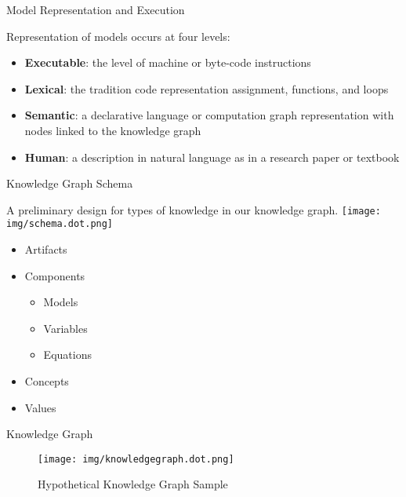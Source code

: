 \documentclass[ignorenonframetext,]{beamer}
\providecommand{\tightlist}{%
  \setlength{\itemsep}{0pt}\setlength{\parskip}{0pt}}
\begin{document}
\begin{frame}{Model Representation and Execution}
\protect\hypertarget{model-representation-and-execution}{}

Representation of models occurs at four levels:

\begin{itemize}
\item
  \textbf{Executable}: the level of machine or byte-code instructions
\item
  \textbf{Lexical}: the tradition code representation assignment,
  functions, and loops
\item
  \textbf{Semantic}: a declarative language or computation graph
  representation with nodes linked to the knowledge graph
\item
  \textbf{Human}: a description in natural language as in a research
  paper or textbook
\end{itemize}

\end{frame}

\begin{frame}{Knowledge Graph Schema}
\protect\hypertarget{knowledge-graph-schema}{}

A preliminary design for types of knowledge in our knowledge graph.
\texttt{[image: img/schema.dot.png]}

\begin{itemize}
\tightlist
\item
  Artifacts
\item
  Components

  \begin{itemize}
  \tightlist
  \item
    Models
  \item
    Variables
  \item
    Equations
  \end{itemize}
\item
  Concepts
\item
  Values
\end{itemize}

\end{frame}

\begin{frame}{Knowledge Graph}
\protect\hypertarget{knowledge-graph}{}

\begin{figure}
\centering
\texttt{[image: img/knowledgegraph.dot.png]}
\caption{Hypothetical Knowledge Graph Sample}
\end{figure}


\end{frame}
\end{document}
